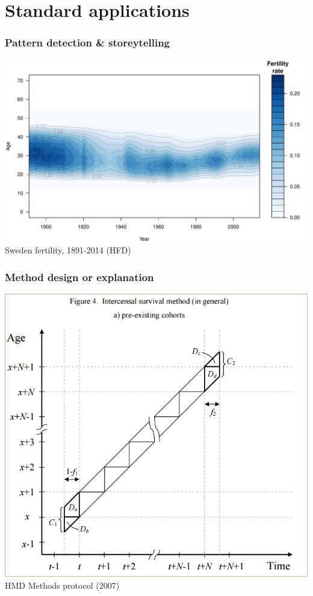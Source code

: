 \documentclass[20pt]{beamer}
\begin{document}
\section{Standard applications}

\begin{frame}
\frametitle{Pattern detection \& storeytelling}
\includegraphics[scale=.85]{Figures/FertAPC.pdf}\\
Sweden fertility, 1891-2014 (HFD)
\end{frame}

\begin{frame}
\frametitle{Method design or explanation}
\includegraphics[scale=.65]{Figures/HMD_MPv5Fig4.png}\\
HMD Methods protocol (2007)
\end{frame}
\end{document}
